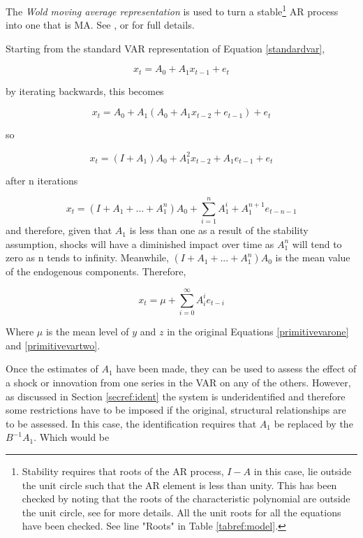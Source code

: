 \documentclass[12pt, a4paper, oneside]{article}\usepackage[]{graphicx}\usepackage[]{color}
\begin{document}
The \emph{Wold moving average representation} is used to turn a stable\footnote{Stability requires that roots of the AR process, $I - A$ in this case, lie outside the unit circle such that the AR element is less than unity.  This has been checked by noting that the roots of the characteristic polynomial are outside the unit circle, see \citep[p19-20]{HarveyTSM} for more details.  All the unit roots for all the equations have been checked. See line "Roots" in Table \ref{tabref:model}.} AR process into one that is MA.   See \citep[p. 17]{HarveyTSM}, \citep[pp. 64 - 70]{Hamilton} or \citep[pp. 307-311]{EndersTS} for full details. 
   
Starting from the standard VAR representation of Equation \ref{standardvar}, 

\begin{equation}
x_t=A_0+A_1x_{t-1}+e_t
\end{equation}

by iterating backwards, this becomes  

\begin{equation}
x_t=A_0 +A_1(A_0 + A_1 x_{t-2} + e_{t-1}) + e_t
\end{equation}

so 

\begin{equation}
x_t=(I+A_1)A_0 + A_1^2 x_{t-2} + A_1 e_{t-1} +e_t
\end{equation}

after n iterations

\begin{equation}
x_t=(I+A_1 + \ldots + A_1^n)A_0 + \sum_{i=1}^n A_1^i + A_1^{n+1} e_{t-n-1}
\end{equation}
and therefore, given that $A_1$ is less than one as a result of the stability assumption, shocks will have a diminished impact over time as $A_1^n$ will tend to zero as n tends to infinity.  Meanwhile, $(I+A_1 + ... + A_1^n)A_0$ is the mean value of the endogenous components.  Therefore, 

\begin{equation}
x_t=\mu + \sum_{i=0}^{\infty} A_i^i e_{t-i}
\end{equation}

Where $\mu$ is the mean level of $y$ and $z$ in the original Equations \ref{primitivevarone} and \ref{primitivevartwo}. 

Once the estimates of $A_1$ have been made, they can be used to assess the effect of a shock or innovation from one series in the VAR on any of the others.    However, as discussed in Section \ref{secref:ident} the system is underidentified and therefore some restrictions have to be imposed if the original, structural relationships are to be assessed.  In this case, the identification requires that $A_1$ be replaced by the $B^{-1}A_1$.  Which would be 
\end{document}
